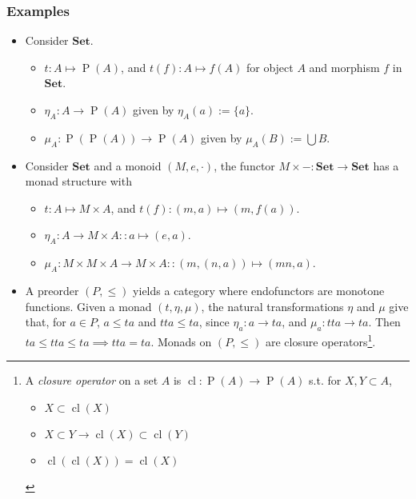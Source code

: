 \documentclass[UTF8,aspectratio=43,11pt,colorlinks,compress,openany]{beamer}%
\begin{document}
\begin{frame}\frametitle{Examples}
\begin{itemize}
	\item Consider $\mathbf{Set}$.
	\begin{itemize}
 		\item $t: A\mapsto \operatorname{P}(A)$, and $t(f): A\mapsto f(A)$ for object $A$ and morphism $f$ in $\mathbf{Set}$.
 		\item $\eta_A: A\to \operatorname{P}(A)$ given by $\eta_A(a):=\{a\}$.
 		\item $\mu_A: \operatorname{P}(\operatorname{P}(A))\to \operatorname{P}(A)$ given by $\mu_A(B):=\bigcup B$.
	\end{itemize}
	\item Consider $\mathbf{Set}$ and a monoid $(M,e,\cdot)$, the functor $M\times -:\mathbf{Set}\to\mathbf{Set}$ has a monad structure with
	\begin{itemize}
		\item $t: A\mapsto M\times A$, and $t(f): (m,a)\mapsto (m,f(a))$.
		\item $\eta_A: A\to M\times A :: a\mapsto (e,a)$.
		\item $\mu_A: M\times M\times A\to M\times A :: (m,(n,a))\mapsto (mn,a)$.
	\end{itemize}
	\item A preorder $(P,\leq)$ yields a category where endofunctors are monotone functions. Given a monad $(t,\eta,\mu)$, the natural transformations $\eta$ and $\mu$ give that, for $a\in P$, $a\leq ta$ and $tta\leq ta$, since $\eta_a: a\to ta$, and $\mu_a: tta\to ta$. Then $ta\leq tta\leq ta\implies tta=ta$. Monads on $(P,\leq)$ are closure operators\footnote{A \emph{closure operator} on a set $A$ is $\operatorname{cl}: \operatorname{P}(A)\to \operatorname{P}(A)$ s.t. for $X,Y\subset A$,
\begin{itemize}
	\item $X\subset \operatorname{cl}(X)$
	\item $X\subset Y\to \operatorname{cl}(X)\subset \operatorname{cl}(Y)$
	\item $\operatorname{cl}(\operatorname{cl}(X))=\operatorname{cl}(X)$
\end{itemize}}.
\end{itemize}
\end{frame}
\end{document}
